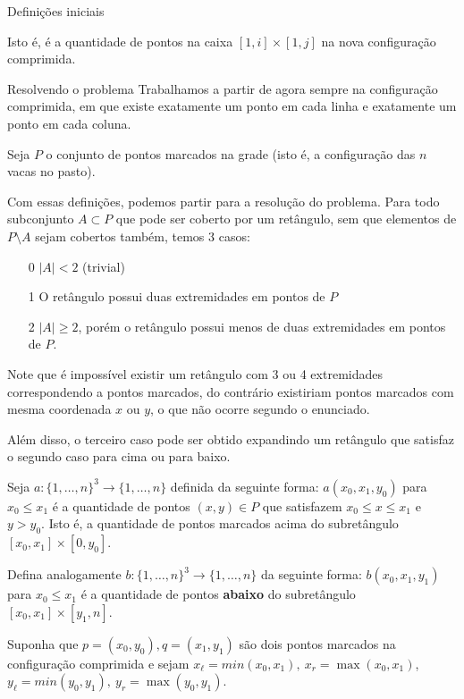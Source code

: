 \documentclass{article}
\begin{document}
\begin{solutionenv}
\begin{generic}{Definições iniciais}{}
\begin{lemma}
        Isto é, é a quantidade de pontos na caixa \([1, i] \times [1, j]\) na nova configuração comprimida.
    \end{lemma} 
\end{generic}

\begin{generic}{Resolvendo o problema}{}
    Trabalhamos a partir de agora sempre na configuração comprimida, em que existe exatamente um ponto em cada linha e exatamente um ponto em cada coluna. 

    Seja \(P\) o conjunto de pontos marcados na grade (isto é, a configuração das \(n\) vacas no pasto).

    Com essas definições, podemos partir para a resolução do problema. Para todo subconjunto \(A \subset P\) que pode ser coberto por um retângulo, sem que elementos de \(P\setminus A\) sejam cobertos também, temos 3 casos:
    \begin{itemize}
        \item[0] \(|A| < 2\) (trivial)
        \item[1] O retângulo possui duas extremidades em pontos de \(P\)
        \item[2] \(|A| \geq 2\), porém o retângulo possui menos de duas extremidades em pontos de \(P\).
    \end{itemize}

    Note que é impossível existir um retângulo com 3 ou 4 extremidades correspondendo a pontos marcados, do contrário existiriam pontos marcados com mesma coordenada \(x\) ou \(y\), o que não ocorre segundo o enunciado.

    Além disso, o terceiro caso pode ser obtido expandindo um retângulo que satisfaz o segundo caso para cima ou para baixo.
    \begin{definition}
        Seja \(a: \{1, \dotsc, n\}^3 \to \{1, \dotsc, n\}\) definida da seguinte forma: \(a(x_0, x_1, y_0)\) para \(x_0 \leq x_1\) é a quantidade de pontos \((x, y) \in P\) que satisfazem \(x_0 \leq x \leq x_1\) e \(y > y_0\). Isto é, a quantidade de pontos marcados acima do subretângulo \([x_0, x_1] \times [0, y_0]\).
        
        Defina analogamente \(b: \{1, \dotsc, n\}^3 \to \{1, \dotsc, n\}\) da seguinte forma: \(b(x_0, x_1, y_1)\) para \(x_0 \leq x_1\) é a quantidade de pontos \textbf{abaixo} do subretângulo \([x_0, x_1] \times [y_1, n]\). 
    \end{definition}

    \begin{lemma}
        Suponha que \(p = (x_0, y_0), q = (x_1, y_1)\) são dois pontos marcados na configuração comprimida e sejam \(x_\ell = min(x_0, x_1), \ x_r = \max(x_0, x_1)\), \(y_\ell = min(y_0, y_1),\ y_r = \max(y_0, y_1)\). 


\end{lemma}
\end{generic}
\end{solutionenv}
\end{document}
